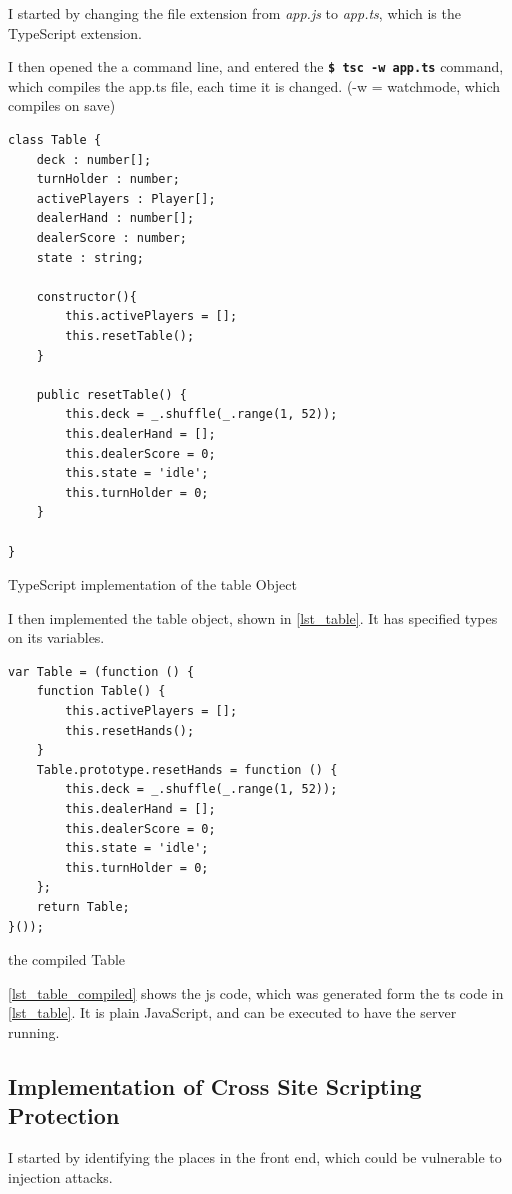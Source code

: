 \documentclass[a4paper]{article}
\begin{document}
I started by changing the file extension from \textit{app.js} to \textit{app.ts}, which is the TypeScript extension.

I then opened the a command line, and entered the \textbf{\texttt{\$ tsc -w app.ts}} command, which compiles the app.ts file, each time it is changed. (-w = watchmode, which compiles on save)

\begin{listing}[H]
\begin{verbatim}
class Table {
    deck : number[];
    turnHolder : number;
    activePlayers : Player[];
    dealerHand : number[];
    dealerScore : number;
    state : string;

    constructor(){
        this.activePlayers = [];
        this.resetTable();
    }

    public resetTable() {
        this.deck = _.shuffle(_.range(1, 52));
        this.dealerHand = [];
        this.dealerScore = 0;
        this.state = 'idle';
        this.turnHolder = 0;
    }
    
}
\end{verbatim}
\caption{TypeScript implementation of the table Object}
\label{lst_table}
\end{listing}

I then implemented the table object, shown in \autoref{lst_table}. It has specified types on its variables.

\begin{listing}[H]
\begin{verbatim}
var Table = (function () {
    function Table() {
        this.activePlayers = [];
        this.resetHands();
    }
    Table.prototype.resetHands = function () {
        this.deck = _.shuffle(_.range(1, 52));
        this.dealerHand = [];
        this.dealerScore = 0;
        this.state = 'idle';
        this.turnHolder = 0;
    };
    return Table;
}());
\end{verbatim}
\caption{the compiled Table}
\label{lst_table_compiled}
\end{listing}


\autoref{lst_table_compiled} shows the js code, which was generated form the ts code in \autoref{lst_table}. It is plain JavaScript, and can be executed to have the server running.


\subsection{Implementation of Cross Site Scripting Protection}
I started by identifying the places in the front end, which could be vulnerable to injection attacks.
\end{document}
